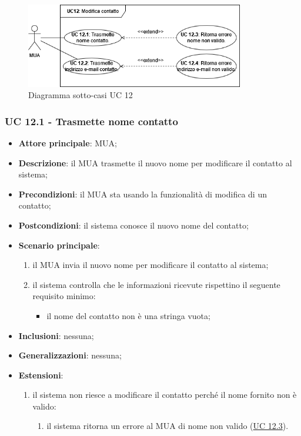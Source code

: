 \begin{figure}[h]
    \includegraphics[width=0.85\textwidth]{sections/uc_imgs/UC12.png}
    \centering
    \caption{Diagramma sotto-casi UC 12}
\end{figure}

\subsubsection{UC 12.1 - Trasmette nome contatto} \label{sec:UC12.1}
    \begin{itemize}
        \item \textbf{Attore principale}: MUA;
        \item \textbf{Descrizione}: il MUA trasmette il nuovo nome per modificare il contatto al sistema;
        \item \textbf{Precondizioni}: il MUA sta usando la funzionalità di modifica di un contatto;
        \item \textbf{Postcondizioni}: il sistema conosce il nuovo nome del contatto;
        \item \textbf{Scenario principale}:
            \begin{enumerate}
                \item il MUA invia il nuovo nome per modificare il contatto al sistema;
                \item il sistema controlla che le informazioni ricevute rispettino il seguente requisito minimo:
                    \begin{itemize}
                        \item il nome del contatto non è una stringa vuota;
                    \end{itemize}
            \end{enumerate}
        \item \textbf{Inclusioni}: nessuna;
        \item \textbf{Generalizzazioni}: nessuna;
        \item \textbf{Estensioni}:
            \begin{enumerate}[label=\alph*.]
                \item il sistema non riesce a modificare il contatto perché il nome fornito non è valido:
                \begin{enumerate}[label=\arabic*.]
                    \item il sistema ritorna un errore al MUA di nome non valido (\hyperref[sec:UC12.3]{UC 12.3}).
                \end{enumerate}
            \end{enumerate}
    \end{itemize}


